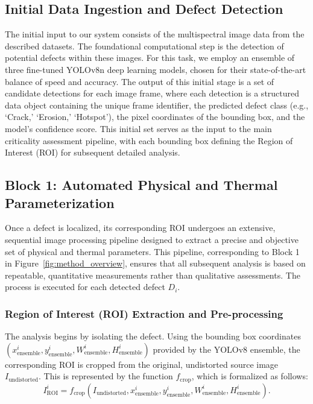 \documentclass[energies,article,submit,pdftex,moreauthors]{Definitions/mdpi}
\begin{document}
\subsection{Initial Data Ingestion and Defect Detection}
The initial input to our system consists of the multispectral image data from the described datasets. The foundational computational step is the detection of potential defects within these images. For this task, we employ an ensemble of three fine-tuned YOLOv8n deep learning models, chosen for their state-of-the-art balance of speed and accuracy. The output of this initial stage is a set of candidate detections for each image frame, where each detection is a structured data object containing the unique frame identifier, the predicted defect class (e.g., `Crack,' `Erosion,' `Hotspot'), the pixel coordinates of the bounding box, and the model's confidence score. This initial set serves as the input to the main criticality assessment pipeline, with each bounding box defining the Region of Interest (ROI) for subsequent detailed analysis.

\subsection{Block 1: Automated Physical and Thermal Parameterization}
Once a defect is localized, its corresponding ROI undergoes an extensive, sequential image processing pipeline designed to extract a precise and objective set of physical and thermal parameters. This pipeline, corresponding to Block 1 in Figure~\ref{fig:method_overview}, ensures that all subsequent analysis is based on repeatable, quantitative measurements rather than qualitative assessments. The process is executed for each detected defect \(D_i\).

\subsubsection{Region of Interest (ROI) Extraction and Pre-processing}
The analysis begins by isolating the defect. Using the bounding box coordinates \((x^i_{\text{ensemble}}, y^i_{\text{ensemble}}, W^i_{\text{ensemble}}, H^i_{\text{ensemble}})\) provided by the YOLOv8 ensemble, the corresponding ROI is cropped from the original, undistorted source image \(I_{\text{undistorted}}\). This is represented by the function \(f_{\text{crop}}\), which is formalized as follows:
\begin{equation}
    I^i_{\text{ROI}} = f_{\text{crop}}(I_{\text{undistorted}}, x^i_{\text{ensemble}}, y^i_{\text{ensemble}}, W^i_{\text{ensemble}}, H^i_{\text{ensemble}}).
    \label{eq:roi_extraction}
\end{equation}
\end{document}
